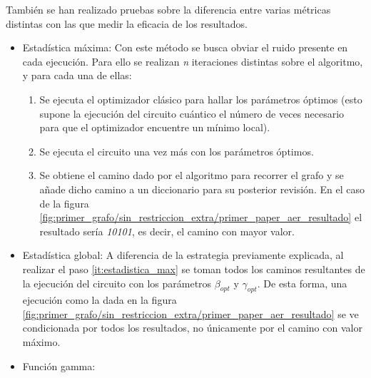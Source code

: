 \documentclass{article}
\begin{document}
También se han realizado pruebas sobre la diferencia entre varias métricas distintas con las que medir la eficacia de los resultados.
\begin{itemize}
\item Estadística máxima:
  Con este método se busca obviar el ruido presente en cada ejecución. Para ello se realizan \textit{n} iteraciones distintas sobre el algoritmo, y para cada una de ellas:
  \begin{enumerate}
  \item Se ejecuta el optimizador clásico para hallar los parámetros óptimos (esto supone la ejecución del circuito cuántico el número de veces necesario para que el optimizador encuentre un mínimo local).
  \item Se ejecuta el circuito una vez más con los parámetros óptimos.
  \item \label{it:estadistica_max} Se obtiene el camino dado por el algoritmo para recorrer el grafo y se añade dicho camino a un diccionario para su posterior revisión. En el caso de la figura \ref{fig:primer_grafo/sin_restriccion_extra/primer_paper_aer_resultado}
    el resultado sería \textit{10101}, es decir, el camino con mayor valor.
  \end{enumerate}
\item Estadística global:
  A diferencia de la estrategia previamente explicada, al realizar el paso \ref{it:estadistica_max} se toman todos los caminos resultantes de la ejecución del circuito con los parámetros \(\beta_{opt}\) y \(\gamma_{opt}\).
  De esta forma, una ejecución como la dada en la figura \ref{fig:primer_grafo/sin_restriccion_extra/primer_paper_aer_resultado}
  se ve condicionada por todos los resultados, no únicamente por el camino con valor máximo.
\item Función gamma:  %
\end{itemize}
\end{document}
